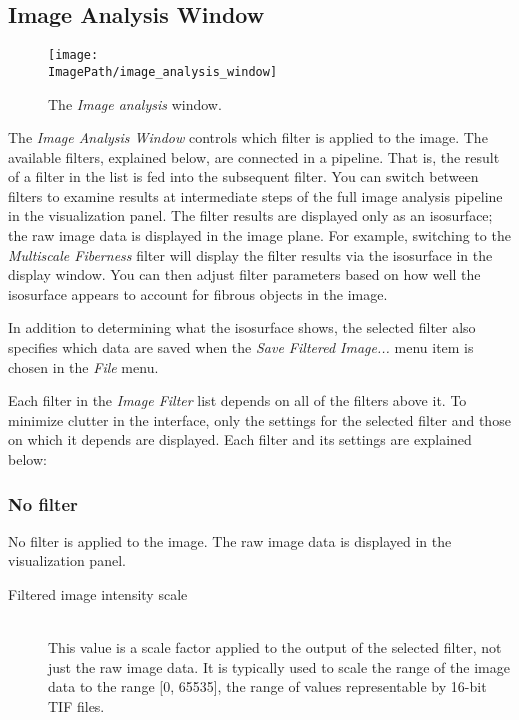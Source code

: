 \documentclass[11pt,titlepage,twoside]{article}
\begin{document}
\subsection{Image Analysis Window}

\begin{figure}[htbp] %
   \centering
   \texttt{[image: \\ImagePath/image\_analysis\_window]} 
   \caption{The \emph{Image analysis} window.}
   \label{fig:ImageAnalysisWindow}
\end{figure}

The \emph{Image Analysis Window} controls which filter is applied to the image. The available filters, explained below, are connected in a pipeline. That is, the result of a filter in the list is fed into the subsequent filter. You can switch between filters to examine results at intermediate steps of the full image analysis pipeline in the visualization panel. The filter results are displayed only as an isosurface; the raw image data is displayed in the image plane. For example, switching to the \emph{Multiscale Fiberness} filter will display the filter results via the isosurface in the
display window. You can then adjust filter parameters based on how well the isosurface
appears to account for fibrous objects in the image.

In addition to determining what the isosurface shows, the selected filter also specifies which data are saved when the \emph{Save Filtered Image...} menu item is chosen in the \emph{File} menu.

Each filter in the \emph{Image Filter} list depends on all of the filters above it. To minimize clutter in the interface, only the settings for the selected filter and those on which it depends are displayed. Each filter and its settings are explained below:

\subsubsection{No filter}
No filter is applied to the image. The raw image data is displayed in the visualization panel.

\begin{description}

\item[Filtered image intensity scale] \hfill \\
This value is a scale factor applied to the output of the selected filter, not just the raw image data. It is typically used to scale the range of the image data to the range [0, 65535], the range of values representable by 16-bit TIF files.

\end{description}
\end{document}
